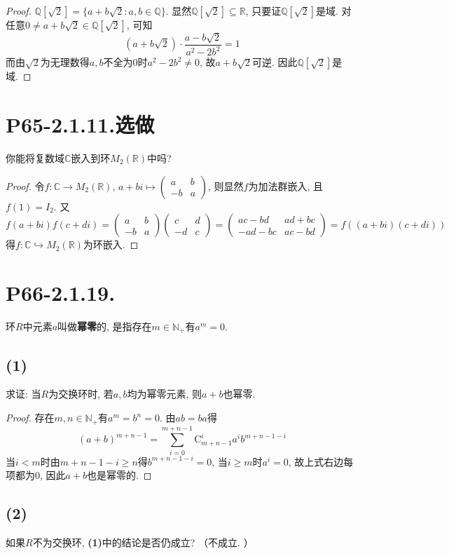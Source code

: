 \documentclass[12pt, a4paper, fontset=windows]{ctexart}
\newcommand{\C}{\mathbb{C}}
\newcommand{\N}{\mathbb{N}}
\newcommand{\Q}{\mathbb{Q}}
\newcommand{\R}{\mathbb{R}}
\newcommand{\kh}[1]{（{#1}）} %
\newcommand{\xuan}{{\normalsize 选做}}
\def\pmat#1{\begin{pmatrix}#1\end{pmatrix}}
\begin{document}
\begin{proof}
$\Q[\sqrt{2}]=\{a+b\sqrt{2}:a,b\in\Q\}$. 
显然$\Q[\sqrt{2}]\subseteq\R$, 只要证$\Q[\sqrt{2}]$是域. 
对任意$0\ne a+b\sqrt{2}\in\Q[\sqrt{2}]$, 可知
\[(a+b\sqrt{2})\cdot\frac{a-b\sqrt{2}}{a^2-2b^2}=1\]
而由$\sqrt{2}$为无理数得$a,b$不全为$0$时$a^2-2b^2\ne 0$, 
故$a+b\sqrt{2}$可逆. 因此$\Q[\sqrt{2}]$是域. 
\end{proof}

\section*{P65-2.1.11.\xuan}

你能将复数域$\C$嵌入到环$M_2(\R)$中吗?

\begin{proof}
令$f:\C\to M_2(\R)$, $a+bi\mapsto\pmat{a&b\\-b&a}$, 
则显然$f$为加法群嵌入, 且$f(1)=I_2$. 又
\[f(a+bi)f(c+di)=\pmat{a&b\\-b&a}\pmat{c&d\\-d&c}=\pmat{ac-bd&ad+bc\\-ad-bc&ac-bd}=f((a+bi)(c+di))\]
得$f:\C\hookrightarrow M_2(\R)$为环嵌入. 
\end{proof}

\section*{P66-2.1.19.}
\label{nilpotent}

环$R$中元素$a$叫做{\bf 幂零}的, 是指存在$m\in\N_+$有$a^m=0$. 

\subsection*{(1)}

求证: 当$R$为交换环时, 若$a,b$均为幂零元素, 则$a+b$也幂零. 

\begin{proof}
存在$m,n\in\N_+$有$a^m=b^n=0$. 由$ab=ba$得
\[(a+b)^{m+n-1}=\sum^{m+n-1}_{i=0}\text{C}^i_{m+n-1}a^ib^{m+n-1-i}\]
当$i<m$时由$m+n-1-i\ge n$得$b^{m+n-1-i}=0$, 当$i\ge m$时$a^i=0$, 
故上式右边每项都为$0$, 因此$a+b$也是幂零的. 
\end{proof}

\subsection*{(2)}

如果$R$不为交换环, {\bf (1)}中的结论是否仍成立? \kh{不成立. }
\end{document}
